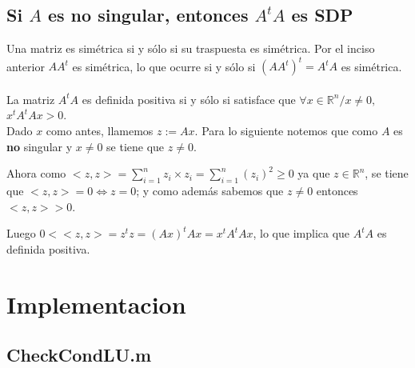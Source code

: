 \documentclass[10pt,a4paper]{article}
\begin{document}
\iffalse
Una matriz es simétrica si $A = A^t$. Es decir, si para todo $j,i \in [1..n]$, $a_{i,j} = a_{j,i}$.

Sea $C = AA^t$ y $b_{i,j}$ los elementos de $A^t$. Al hacer el producto, en la posición $c_{i,j}$ nos queda:

\begin{equation}
c_{i,j} = \sum_{k=1}^{n} a_{i,k} \times b_{k,j}
\end{equation}

Por la definición de transpuesta $b_{i,j} = a_{j,i}$, entonces:

\begin{equation}
c_{i,j} = \sum_{k=1}^{n} a_{i,k} \times a_{j,k}
\end{equation}

Para que el producto sea simétrico entonces $c_{i,j} = c_{j,i}$, lo que efectivamente sucede si intercambiamos los indices en la ecuación 5. 
\fi
\subsection{Si $A$ es no singular, entonces $A^tA$ es SDP}

Una matriz es simétrica si y sólo si su traspuesta es simétrica. Por el inciso anterior $AA^t$ es simétrica, lo que ocurre si y sólo si $(AA^t)^t = A^tA$ es simétrica.
\\
\\
La matriz $A^tA$ es definida positiva si y sólo si satisface que $\forall x \in \mathbb{R}^n / x \neq 0,$ $x^tA^tAx > 0$.
\\
Dado $x$ como antes, llamemos $z:=Ax$. Para lo siguiente notemos que como $A$ es \textbf{no} singular y $ x \neq 0$ se tiene que $z \neq 0$.

Ahora como $<z,z> = \sum_{i=1}^{n} z_i \times z_i = \sum_{i=1}^{n} (z_i)^2 \geq 0$ ya que $z \in \mathbb{R}^n$, se tiene que $<z,z> = 0 \Leftrightarrow z = 0$; y como además sabemos que $z \neq 0$ entonces $ <z,z>  > 0$.

Luego $0 < <z,z> = z^tz = (Ax)^tAx = x^tA^tAx$, lo que implica que $A^tA$ es definida positiva.

\pagebreak

\section{Implementacion}

\subsection{CheckCondLU.m}
\end{document}
